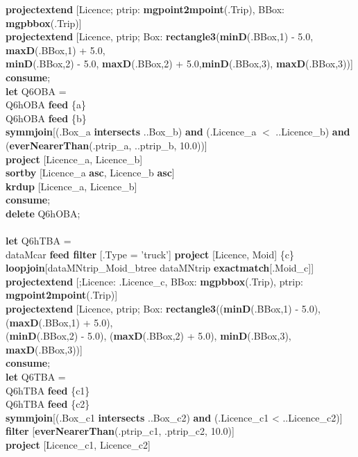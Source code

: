 \documentclass[a4paper]{article}
\newcommand{\op}[1]{\textbf{#1}}
\begin{document}
\begin{scriptsize}
\begin{tabbing}
\>\op{projectextend} [Licence; ptrip: \op{mgpoint2mpoint}(.Trip), BBox: \op{mgpbbox}(.Trip)]\\
\>\op{projectextend} [Licence, ptrip; Box: \op{rectangle3}(\op{minD}(.BBox,1) - 5.0, \op{maxD}(.BBox,1) + 5.0,\\
\>\>\>\>\op{minD}(.BBox,2) - 5.0, \op{maxD}(.BBox,2) + 5.0,\op{minD}(.BBox,3), \op{maxD}(.BBox,3))]\\
\op{consume};\\
\op{let} Q6OBA =\\
\>Q6hOBA \op{feed} \{a\}\\
\>Q6hOBA \op{feed} \{b\}\\
\>\op{symmjoin}[(.Box\_a \op{intersects} ..Box\_b) \op{and} (.Licence\_a $<$
..Licence\_b) \op{and}\\
\>\>\>\>(\op{everNearerThan}(.ptrip\_a, ..ptrip\_b, 10.0))]\\
\>\op{project} [Licence\_a, Licence\_b]\\
\>\op{sortby} [Licence\_a \op{asc}, Licence\_b \op{asc}]\\
\>\op{krdup} [Licence\_a, Licence\_b]\\
\op{consume};\\
\op{delete} Q6hOBA;\\
\\
\op{let} Q6hTBA =\\
\>dataMcar \op{feed filter} [.Type = 'truck'] \op{project} [Licence, Moid]
\{c\}\\
\>\op{loopjoin}[dataMNtrip\_Moid\_btree dataMNtrip \op{exactmatch}[.Moid\_c]]\\
\>\op{projectextend} [;Licence: .Licence\_c, BBox: \op{mgpbbox}(.Trip), ptrip: \op{mgpoint2mpoint}(.Trip)]\\
\>\op{projectextend} [Licence, ptrip; Box: \op{rectangle3}((\op{minD}(.BBox,1) - 5.0), (\op{maxD}(.BBox,1) + 5.0),\\
\>\>\>\>(\op{minD}(.BBox,2) - 5.0), (\op{maxD}(.BBox,2) + 5.0), \op{minD}(.BBox,3), \op{maxD}(.BBox,3))]\\
\op{consume};\\
\op{let} Q6TBA =\\
\>Q6hTBA \op{feed} \{c1\}\\
\>Q6hTBA \op{feed} \{c2\}\\
\>\op{symmjoin}[(.Box\_c1 \op{intersects} ..Box\_c2) \op{and} (.Licence\_c1 < ..Licence\_c2)]\\
\>\op{filter} [\op{everNearerThan}(.ptrip\_c1, .ptrip\_c2, 10.0)]\\
\>\op{project} [Licence\_c1, Licence\_c2]\\

\end{tabbing}
\end{scriptsize}
\end{document}
